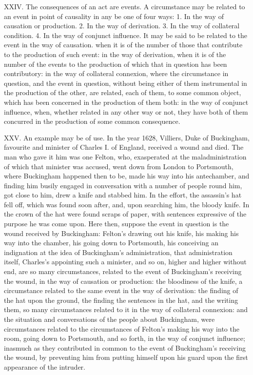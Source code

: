 \documentclass[12pt]{report}
\begin{document}
XXIV. The consequences of an act are events. A circumstance may be
related to an event in point of causality in any be one of four ways: 1.
In the way of causation or production. 2. In the way of derivation. 3.
In the way of collateral condition. 4. In the way of conjunct influence.
It may be said to be related to the event in the way of causation. when
it is of the number of those that contribute to the production of such
event: in the way of derivation, when it is of the number of the events
to the production of which that in question has been contributory: in
the way of collateral connexion, where the circumstance in question, and
the event in question, without being either of them instrumental in the
production of the other, are related, each of them, to some common
object, which has been concerned in the production of them both: in the
way of conjunct influence, when, whether related in any other way or
not, they have both of them concurred in the production of some common
consequence.

XXV. An example may be of use. In the year 1628, Villiers, Duke of
Buckingham, favourite and minister of Charles I. of England, received a
wound and died. The man who gave it him was one Felton, who, exasperated
at the maladministration of which that minister was accused, went down
from London to Portsmouth, where Buckingham happened then to be, made
his way into his antechamber, and finding him busily engaged in
conversation with a number of people round him, got close to him, drew a
knife and stabbed him. In the effort, the assassin's hat fell off, which
was found soon after, and, upon searching him, the bloody knife. In the
crown of the hat were found scraps of paper, with sentences expressive
of the purpose he was come upon. Here then, suppose the event in
question is the wound received by Buckingham: Felton's drawing out his
knife, his making his way into the chamber, his going down to
Portsmouth, his conceiving an indignation at the idea of Buckingham's
administration, that administration itself, Charles's appointing such a
minister, and so on, higher and higher without end, are so many
circumstances, related to the event of Buckingham's receiving the wound,
in the way of causation or production: the bloodiness of the knife, a
circumstance related to the same event in the way of derivation: the
finding of the hat upon the ground, the finding the sentences in the
hat, and the writing them, so many circumstances related to it in the
way of collateral connexion: and the situation and conversations of the
people about Buckingham, were circumstances related to the circumstances
of Felton's making his way into the room, going down to Portsmouth, and
so forth, in the way of conjunct influence; inasmuch as they contributed
in common to the event of Buckingham's receiving the wound, by
preventing him from putting himself upon his guard upon the first
appearance of the intruder.
\end{document}
